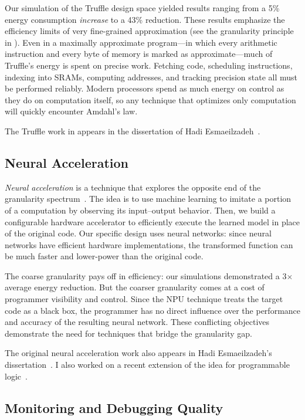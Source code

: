 Our simulation of the Truffle design space yielded results ranging from a 5\%
energy consumption \emph{increase} to a 43\% reduction.
These results emphasize the efficiency limits of very fine-grained
approximation (see the granularity principle in ).
Even in a maximally approximate program---in which every
arithmetic instruction and every byte of memory is marked as
approximate---much of Truffle's energy is spent on precise work. Fetching
code, scheduling instructions, indexing into SRAMs, computing addresses, and
tracking precision state all must be performed reliably.
Modern processors spend as much energy on
control as they do on computation itself, so any technique that optimizes only
computation will quickly encounter Amdahl's law.

The Truffle work in appears in the dissertation of Hadi
Esmaeilzadeh~\cite{hadi-thesis}.


\subsection{Neural Acceleration}
\label{sec:npu}

\emph{Neural acceleration} is a technique that explores the opposite end of
the granularity spectrum~\cite{npu, snnap}.
The idea is to use machine learning to imitate a portion of a computation by
observing its input--output behavior.
Then, we build a configurable hardware accelerator to efficiently execute the
learned model in place of the original code.
Our specific design uses neural networks:
since neural networks have
efficient hardware implementations, the transformed function can be much
faster and lower-power than the original code.

The coarse granularity pays off in efficiency: our simulations demonstrated a
3$\times$ average energy reduction.
But the coarser granularity comes at a cost of programmer visibility and
control.
Since the NPU technique treats the target code as a black box, the
programmer has no direct influence over the performance and accuracy of the
resulting neural network.
These conflicting objectives demonstrate the need for techniques that bridge
the granularity gap.

The original neural acceleration work also appears in Hadi Esmaeilzadeh's
dissertation~\cite{hadi-thesis}.
I also worked on a recent extension of the idea for programmable
logic~\cite{snnap}.


\subsection{Monitoring and Debugging Quality}

